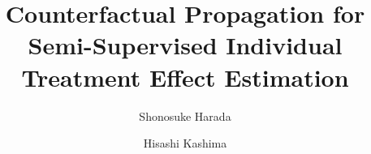 \documentclass[runningheads]{llncs}
\begin{document}
%
\title{Counterfactual Propagation for Semi-Supervised Individual Treatment Effect Estimation}
%
%
\author{Shonosuke Harada \and Hisashi Kashima}
%
%



\end{document}
